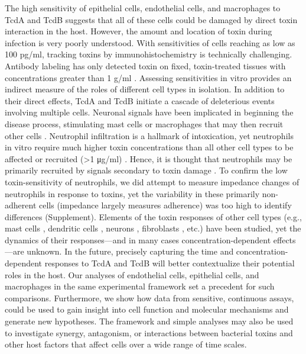 The high sensitivity of epithelial cells, endothelial cells, 
and macrophages to TcdA and TcdB suggests that all of 
these cells could be damaged by direct toxin interaction 
in the host. However, the amount and location of toxin 
during infection is very poorly understood. With 
sensitivities of cells reaching as low as 100 pg/ml, 
tracking toxins by immunohistochemistry is technically 
challenging. Antibody labeling has only detected toxin 
on fixed, toxin-treated tissues with concentrations 
greater than 1 \textmugreek{}g/ml \cite{Keel:2007jh}. Assessing sensitivities 
in vitro provides an indirect measure of the roles of 
different cell types in isolation. In addition to their 
direct effects, TcdA and TcdB initiate a cascade of 
deleterious events involving multiple cells. Neuronal 
signals have been implicated in beginning the disease 
process, stimulating mast cells or macrophages that may then 
recruit other cells 
\cite{Sorensson:2001da,Pothoulakis:1998vca,
Castagliuolo:1998fu,Castagliuolo:1994ta}. 
Neutrophil infiltration is a 
hallmark of intoxication, yet neutrophils in vitro require 
much higher toxin concentrations than all other cell types 
to be affected or recruited (>1 μg/ml) 
\cite{Kelly:1994cu,Brito:2002kq,Shah:1991ww,Pothoulakis:1988dk,Dailey:1987vo}. 
Hence, it is thought that neutrophils may be primarily 
recruited by signals secondary to toxin 
damage \cite{Kelly:1994cu,Sun:2010kt,Voth:2005di}. 
To confirm the low toxin-sensitivity of neutrophils, we 
did attempt to measure impedance changes of neutrophils 
in response to toxins, yet the variability in these 
primarily non-adherent cells (impedance largely measures adherence) 
was too high to identify differences (Supplement). 
Elements of the toxin responses of other cell types 
(e.g., mast cells \cite{Meyer:2007kj,Calderon:1998tr,Gerhard:2011hm}, 
dendritic cells \cite{Lee:2008jf,Jafari:2013ji}, 
neurons \cite{Xia:2000gg,Neunlist:2003ba}, 
fibroblasts \cite{Wedel:1983vd,ChavesOlarte:1996jy}, etc.) have been 
studied, yet the dynamics of their responses—and in many 
cases concentration-dependent effects—are unknown. In the 
future, precisely capturing the time and concentration-dependent 
responses to TcdA and TcdB will better contextualize their 
potential roles in the host. Our analyses of endothelial 
cells, epithelial cells, and macrophages in the same 
experimental framework set a precedent for such comparisons. 
Furthermore, we show how data from sensitive, continuous 
assays, could be used to gain insight into cell function 
and molecular mechanisms and generate new hypotheses. The 
framework and simple analyses may also be used to investigate 
synergy, antagonism, or interactions between bacterial toxins 
and other host factors that affect cells over a wide range of 
time scales.


